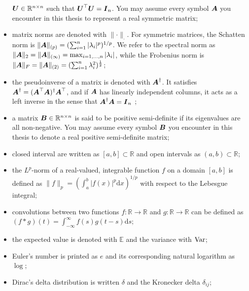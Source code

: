 \begin{itemize}
          $\boldsymbol{U} \in \mathbb{R}^{n \times n}$ such that $\boldsymbol{U}^{\top} \boldsymbol{U} = \boldsymbol{I}_n$.
          You may assume every symbol $\boldsymbol{A}$ you encounter in this thesis to
          represent a real symmetric matrix;
    \item matrix norms are denoted with $\lVert \cdot \rVert _{\cdot}$.
          For symmetric matrices, the Schatten norm is
          $\lVert \boldsymbol{A} \rVert _{(p)} = (\sum_{i=1}^n |\lambda_i|^p)^{1/p}$.
          We refer to the spectral norm as
          $\lVert \boldsymbol{A} \rVert _2 = \lVert \boldsymbol{A} \rVert _{(\infty)} = \max_{i=1,\dots,n}|\lambda_i|$, while the Frobenius norm
          is $\lVert \boldsymbol{A} \rVert _F = \lVert \boldsymbol{A} \rVert _{(2)} = (\sum_{i=1}^{n} \lambda_i^2)^{\frac{1}{2}}$;
    \item the pseudoinverse of a matrix is denoted with $\boldsymbol{A}^{\dagger}$. It
          satisfies $\boldsymbol{A}^{\dagger}=(\boldsymbol{A}^{\top} \boldsymbol{A})^{\dagger} \boldsymbol{A}^{\top}$,
          and if $\boldsymbol{A}$ has linearly independent columns, it acts as a left inverse
          in the sense that $\boldsymbol{A}^{\dagger} \boldsymbol{A} = \boldsymbol{I}_n$ \cite{penrose1955pseudo};
    \item a matrix $\boldsymbol{B} \in \mathbb{R}^{n \times n}$ is said to be positive
          semi-definite if its eigenvalues are all non-negative. You may assume every
          symbol $\boldsymbol{B}$ you encounter in this thesis to denote a real positive
          semi-definite matrix;
    \item closed interval are written as $[a, b] \subset \mathbb{R}$ and open
          intervals as $(a, b) \subset \mathbb{R}$;
    \item the $L^p$-norm of a real-valued, integrable function $f$ on a
          domain $[a, b]$ is defined as
          $\lVert f \rVert _{p} = (\int_{a}^{b} |f(x)|^p \mathrm{d}x)^{1/p}$ with
          respect to the Lebesgue integral;
    \item convolutions between two functions $f:\mathbb{R} \to \mathbb{R}$ and $g:\mathbb{R} \to \mathbb{R}$
          can be defined as $(f \ast g)(t) = \int_{-\infty}^{\infty}f(s)g(t-s)\mathrm{d}s$;
    \item the expected value is denoted with $\mathbb{E}$ and the variance with $\operatorname{Var}$;
    \item Euler's number is printed as $e$ and its corresponding natural logarithm as $\log$;
    \item Dirac's delta distribution is written $\delta$ \cite[chapter~15]{dirac1947quantum}
          and the Kronecker delta $\delta_{ij}$;

\end{itemize}
